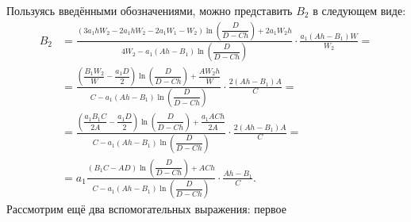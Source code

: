 \documentclass[a4paper,14pt]{article}
\begin{document}
Пользуясь введёнными обозначениями, можно представить $B_2$ в следующем виде:
\begin{equation}
  \label{eq:B_2}
  \begin{aligned}
    B_2
    &=
      \frac{
      \left( 3 a_1 h W_2 - 2 a_1 h W_2 - 2 a_1 W_1 - W_2 \right)
      \ln \left( \dfrac{D}{D - C h} \right)
      + 2 a_1 W_2 h
      }{4 W_2 - a_1 (A h - B_1)
      \ln \left( \dfrac{D}{D - C h} \right)
      }
      \cdot
      \frac{a_1 (A h - B_1) W}{W_2}
      = \\
    &=
      \frac{
      \left( \dfrac{B_1 W_2}{W} - \dfrac{a_1 D}{2} \right)
      \ln \left( \dfrac{D}{D - C h} \right)
      + \dfrac{A W_2 h}{W}
      }{C - a_1 (A h - B_1)
      \ln \left( \dfrac{D}{D - C h} \right)
      }
      \cdot
      \frac{2 (A h - B_1) A}{C}
      = \\
    &=
      \frac{
      \left( \dfrac{a_1 B_1 C}{2 A} - \dfrac{a_1 D}{2} \right)
      \ln \left( \dfrac{D}{D - C h} \right)
      + \dfrac{a_1 A C h}{2 A}
      }{C - a_1 (A h - B_1)
      \ln \left( \dfrac{D}{D - C h} \right)
      }
      \cdot
      \frac{2 (A h - B_1) A}{C}
      = \\
    &=
      a_1
      \frac{
      \left(B_1 C - A D \right)
      \ln \left( \dfrac{D}{D - C h} \right)
      + A C h
      }{C - a_1 (A h - B_1)
      \ln \left( \dfrac{D}{D - C h} \right)
      }
      \cdot
      \frac{A h - B_1}{C}.
  \end{aligned}
\end{equation}
Рассмотрим ещё два вспомогательных выражения: первое
\end{document}
